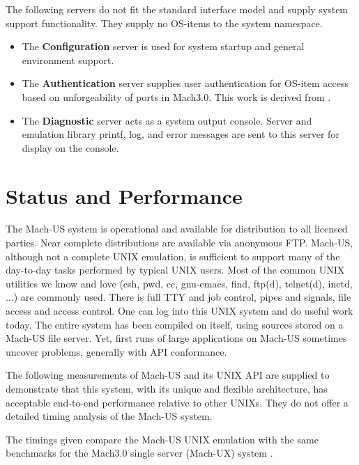 The following servers do not fit the standard interface model and supply
system support functionality.  They supply no OS-items to the system namespace.
\begin{itemize}
\item The {\bf Configuration} server is used for system startup 
and general environment support.

\item The {\bf Authentication} server supplies user authentication for
OS-item access based on unforgeability of ports in Mach3.0.  This work is
derived from \cite{SANSOM}.

\item The {\bf Diagnostic} server acts as a system output console.  Server
and emulation library printf, log, and error messages are sent to
this server for display on the console.
\end{itemize}

\section{Status and Performance}
The Mach-US system is
operational and available for distribution to all licensed parties.
Near complete distributions are available via anonymous FTP.
Mach-US, although not a complete UNIX emulation, is sufficient
to support many of the day-to-day tasks performed by typical UNIX
users.
Most of the common UNIX utilities we know and love
(csh, pwd, cc, gnu-emacs, find, ftp(d), telnet(d), inetd, ...)
are commonly used.  There is full TTY and job control,
pipes and signals, file access and access control.
One can log into this UNIX system and do useful work today.
The entire system
has been compiled on itself, using sources stored on a Mach-US file
server. 
Yet, first runs of large applications on Mach-US
sometimes uncover problems, generally with API conformance.

The following measurements of Mach-US and its UNIX API
are supplied to demonstrate that this system,
with its unique and flexible architecture,
has acceptable end-to-end performance relative to other UNIXs.
They do not offer a detailed timing analysis of the
Mach-US system.

The timings given compare the Mach-US UNIX emulation with
the same benchmarks for the Mach3.0 single server (Mach-UX)
system \cite{MachUX}.

